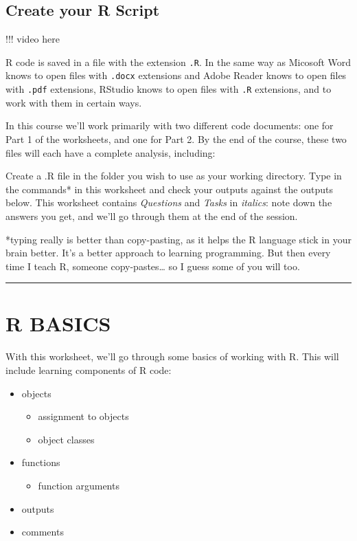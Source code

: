 \documentclass[
]{book}
\providecommand{\tightlist}{%
  \setlength{\itemsep}{0pt}\setlength{\parskip}{0pt}}
\begin{document}
\hypertarget{create-your-r-script}{%
\subsection{Create your R Script}\label{create-your-r-script}}

!!! video here

R code is saved in a file with the extension \texttt{.R}. In the same way as Micosoft
Word knows to open files with \texttt{.docx} extensions and Adobe Reader knows to
open files with \texttt{.pdf} extensions, RStudio knows to open files with \texttt{.R}
extensions, and to work with them in certain ways.

In this course we'll work primarily with two different code documents: one
for Part 1 of the worksheets, and one for Part 2. By the end of the course,
these two files will each have a complete analysis, including:

Create a .R file in the folder you wish to use as your working directory. Type
in the commands* in this worksheet and check your outputs against the outputs
below. This worksheet contains \emph{Questions} and \emph{Tasks} in \emph{italics}: note
down the answers you get, and we'll go through them at the end of the session.

*typing really is better than copy-pasting, as it helps the R language stick in your
brain better. It's a better approach to learning programming. But then every time I teach R,
someone copy-pastes\ldots{} so I guess some of you will too.

\begin{center}\rule{0.5\linewidth}{0.5pt}\end{center}

\hypertarget{r-basics-1}{%
\section{R BASICS}\label{r-basics-1}}

With this worksheet, we'll go through some basics of working with R. This will
include learning components of R code:

\begin{itemize}
\tightlist
\item
  objects

  \begin{itemize}
  \tightlist
  \item
    assignment to objects
  \item
    object classes
  \end{itemize}
\item
  functions

  \begin{itemize}
  \tightlist
  \item
    function arguments
  \end{itemize}
\item
  outputs
\item
  comments\\
\end{itemize}
\end{document}
